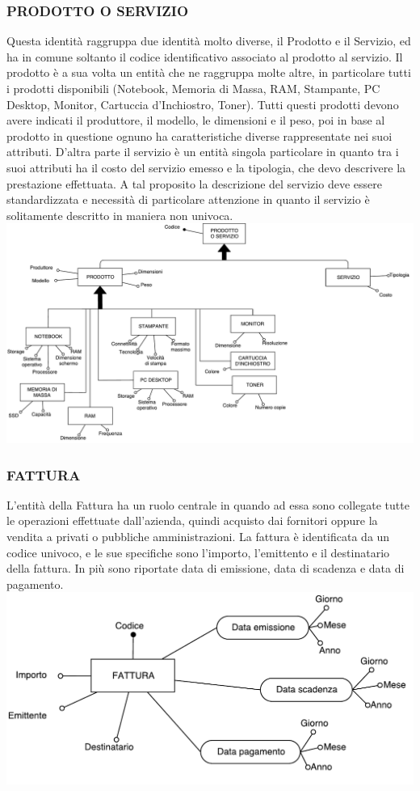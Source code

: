 \subsubsection{PRODOTTO O SERVIZIO}
Questa identità raggruppa due identità molto diverse, il Prodotto e il Servizio, ed ha in comune soltanto il codice identificativo associato al prodotto al servizio.\newline
Il prodotto è a sua volta un entità che ne raggruppa molte altre, in particolare tutti i prodotti disponibili (Notebook, Memoria di Massa, RAM, Stampante, PC Desktop, Monitor, Cartuccia d'Inchiostro, Toner). Tutti questi prodotti devono avere indicati il produttore, il modello, le dimensioni e il peso, poi in base al prodotto in questione ognuno ha caratteristiche diverse rappresentate nei suoi attributi.\newline
D'altra parte il servizio è un entità singola particolare in quanto tra i suoi attributi ha il costo del servizio emesso e la tipologia, che devo descrivere la prestazione effettuata. A tal proposito la descrizione del servizio deve essere standardizzata e necessità di particolare attenzione in quanto il servizio è solitamente descritto in maniera non univoca. \newline
\includegraphics[width=0.7\linewidth]{./immagini/prodotto_servizio.pdf}

\subsubsection{FATTURA}
L'entità della Fattura ha un ruolo centrale in quando ad essa sono collegate tutte le operazioni effettuate dall'azienda, quindi acquisto dai fornitori oppure la vendita a privati o pubbliche amministrazioni.\newline
La fattura è identificata da un codice univoco, e le sue specifiche sono l'importo, l'emittento e il destinatario della fattura. In più sono riportate data di emissione, data di scadenza e data di pagamento.\newline
\includegraphics[width=0.7\linewidth]{./immagini/fattura.pdf}



